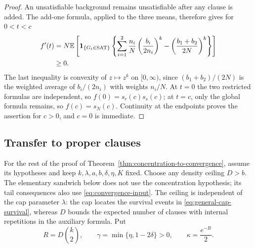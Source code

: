 \begin{proof}
An unsatisfiable background remains unsatisfiable after any clause is
added.  The add-one formula, applied to the three means, therefore gives
for \(0<t<c\)
\begin{align*}
 f'(t)
 &=N\mathbb E\left[\mathbf 1_{\{G_t\in\mathrm{SAT}\}}
   \left\{\sum_{i=1}^{2}\frac{n_i}{N}
       \left(\frac{b_i}{2n_i}\right)^k
       -\left(\frac{b_1+b_2}{2N}\right)^k\right\}\right]\\
 &\ge0.
\end{align*}
The last inequality is convexity of \(z\mapsto z^k\) on
\([0,\infty)\), since \((b_1+b_2)/(2N)\) is the weighted average of
\(b_i/(2n_i)\) with weights \(n_i/N\).  At \(t=0\) the two restricted
formulas are independent, so \(f(0)=s_r(c)s_s(c)\); at \(t=c\), only
the global formula remains, so \(f(c)=s_N(c)\).  Continuity at the
endpoints proves the assertion for \(c>0\), and \(c=0\) is immediate.
\end{proof}

\subsection{Transfer to proper clauses}

For the rest of the proof of
Theorem~\ref{thm:concentration-to-convergence}, assume its hypotheses
and keep \(k,\lambda,a,b,\delta,\eta,K\) fixed.  Choose any density
ceiling \(D>b\).  The elementary sandwich below does not use the
concentration hypothesis; its tail consequences also use
\eqref{eq:convergence-input}.  The ceiling is independent of the cap
parameter \(\lambda\): the cap locates the survival events in
\eqref{eq:general-cap-survival}, whereas \(D\) bounds the expected number
of clauses with internal repetitions in the auxiliary formula.  Put
\begin{equation}\label{eq:transfer-parameters}
 R=D\binom{k}{2},\qquad
 \gamma=\min\{\eta,1-2\delta\}>0,\qquad
 \kappa=\frac{e^{-R}}2.
\end{equation}

